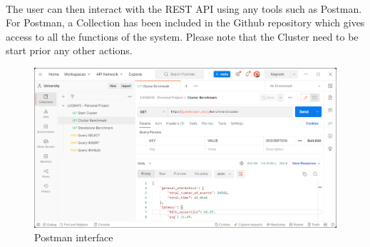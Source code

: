 \paragraph{}The user can then interact with the REST API using any tools such as Postman. For Postman, a Collection has been included in the Github repository which gives access to all the functions of the system. Please note that the Cluster need to be start prior any other actions.

\begin{figure}[htbp]
  \centering
  \includegraphics[width=14cm]{Resources/postman.png}
  \caption{Postman interface}
\end{figure}\\


